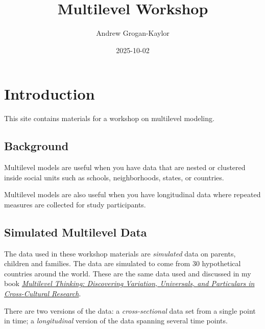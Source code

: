 \documentclass[
  letterpaper,
  DIV=11,
  numbers=noendperiod]{scrreprt}
\title{Multilevel Workshop}
\author{Andrew Grogan-Kaylor}
\date{2025-10-02}
\renewcommand*\contentsname{Table of contents}
\newcommand\contentsname{Table of contents}
\begin{document}
\maketitle

\renewcommand*\contentsname{Table of contents}
{
\hypersetup{linkcolor=}
\setcounter{tocdepth}{2}
\tableofcontents
}
\listoffigures
\listoftables


\chapter{Introduction}\label{introduction}

This site contains materials for a workshop on multilevel modeling.

\section{Background}\label{background}

Multilevel models are useful when you have data that are nested or
clustered inside social units such as schools, neighborhoods, states, or
countries.

Multilevel models are also useful when you have longitudinal data where
repeated measures are collected for study participants.

\section{Simulated Multilevel Data}\label{simulated-multilevel-data}

The data used in these workshop materials are \emph{simulated} data on
parents, children and families. The data are simulated to come from 30
hypothetical countries around the world. These are the same data used
and discussed in my book
\emph{\href{https://academic.oup.com/book/60530}{Multilevel Thinking:
Discovering Variation, Universals, and Particulars in Cross-Cultural
Research}}.

There are two versions of the data: a \emph{cross-sectional} data set
from a single point in time; a \emph{longitudinal} version of the data
spanning several time points.
\end{document}
